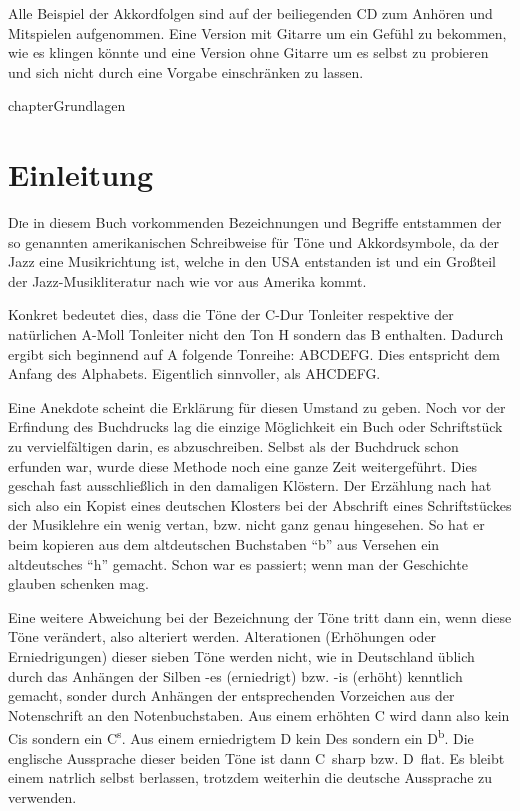 \documentclass[BCOR12mm,DIV11,headings=normal]{scrbook}
\newcommand{\Altbe}{ \enquote{\hspace{.5mm}b\hspace{.3mm}}}
\newcommand{\Altha}{ \enquote{\hspace{.5mm}h\hspace{.3mm}}}
\newcommand{\be}{\textsuperscript{\Notation \hspace{.3mm}b}}
\newcommand{\kreuz}{\textsuperscript{\Notation \hspace{.3mm}s}}
\begin{document}
Alle Beispiel der Akkordfolgen sind auf der beiliegenden CD zum Anhören und Mitspielen aufgenommen. Eine Version mit Gitarre um ein Gefühl zu bekommen, wie es klingen könnte und eine Version ohne Gitarre um es selbst zu probieren und sich nicht durch eine Vorgabe einschränken zu lassen.

chapter{Grundlagen}
\label{grundlagen}

\section{Einleitung}
\label{einleitung}

\lettrine{D}ie in diesem Buch vorkommenden Bezeichnungen und Begriffe entstammen der so genannten amerikanischen Schreibweise für Töne und Akkordsymbole, da der Jazz eine Musikrichtung ist, welche in den USA entstanden ist und ein Großteil der Jazz-Musikliteratur nach wie vor aus Amerika kommt.

Konkret bedeutet dies, dass die Töne der C-Dur Tonleiter respektive der natürlichen A-Moll Tonleiter nicht den Ton H sondern das B enthalten. Dadurch ergibt sich beginnend auf A folgende Tonreihe: ABCDEFG. Dies entspricht dem Anfang des Alphabets. Eigentlich sinnvoller, als AHCDEFG.

Eine Anekdote scheint die Erklärung für diesen Umstand zu geben. Noch vor der Erfindung des Buchdrucks lag die einzige Möglichkeit ein Buch oder Schriftstück zu vervielfältigen darin, es abzuschreiben. Selbst als der Buchdruck schon erfunden war, wurde diese Methode noch eine ganze Zeit weitergeführt. Dies geschah fast ausschließlich in den damaligen Klöstern. Der Erzählung nach hat sich also ein Kopist eines deutschen Klosters bei der Abschrift eines Schriftstückes der Musiklehre ein wenig vertan, bzw. nicht ganz genau hingesehen. So hat er beim kopieren aus dem altdeutschen Buchstaben {\Altbe} aus Versehen ein altdeutsches {\Altha} gemacht. Schon war es passiert; wenn man der Geschichte glauben schenken mag.

Eine weitere Abweichung bei der Bezeichnung der Töne tritt dann ein, wenn diese Töne verändert, also alteriert werden. Alterationen (Erhöhungen oder Erniedrigungen) dieser sieben Töne werden nicht, wie in Deutschland üblich durch das Anhängen der Silben -es (erniedrigt) bzw. -is (erhöht) kenntlich gemacht, sonder durch Anhängen der entsprechenden Vorzeichen aus der Notenschrift an den Notenbuchstaben. Aus einem erhöhten C wird dann also kein Cis sondern ein C\kreuz. Aus einem erniedrigtem D kein Des sondern ein D\be. Die englische Aussprache dieser beiden Töne ist dann C~sharp bzw. D~flat. Es bleibt einem natrlich selbst berlassen, trotzdem weiterhin die deutsche Aussprache zu verwenden.
\end{document}
